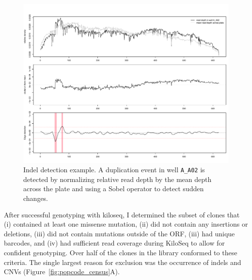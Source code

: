 \begin{figure}[h!]
	\centering
	\includegraphics[width=\textwidth]{img/border_detect.pdf}
	\caption{Indel detection example. A duplication event in well \texttt{A\_A02} is detected by normalizing relative read depth by the mean depth across the plate and using a Sobel operator to detect sudden changes.}
	\label{fig:border_detect}
\end{figure}


After successful genotyping with kiloseq, I determined the subset of clones that (i) contained at least one missense mutation, (ii) did not contain any insertions or deletions, (iii) did not contain mutations outside of the ORF, (iii) had unique barcodes, and (iv) had sufficient read coverage during KiloSeq to allow for confident genotyping.
Over half of the clones in the library conformed to these criteria. The single largest reason for exclusion was the occurrence of indels and CNVs (Figure~\ref{fig:popcode_census}A). 

